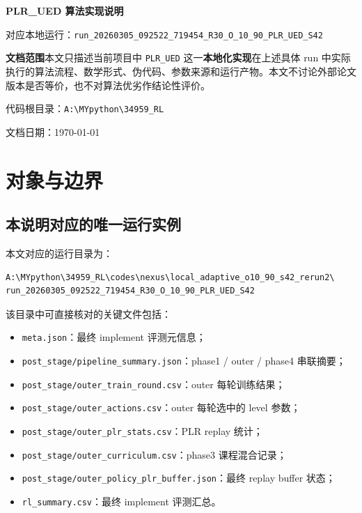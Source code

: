 \documentclass[11pt,a4paper]{ctexart}
\begin{document}
\begin{titlepage}
\centering
\vspace*{2cm}
{\Huge\bfseries PLR\_UED 算法实现说明\par}
\vspace{0.6cm}
{\Large 对应本地运行：\texttt{run\_20260305\_092522\_719454\_R30\_O\_10\_90\_PLR\_UED\_S42}\par}
\vspace{1.2cm}
\begin{tcolorbox}[colback=blue!3,colframe=MidnightBlue,boxrule=0.8pt,width=0.94\textwidth]
\textbf{文档范围}\quad 本文只描述当前项目中 \texttt{PLR\_UED} 这一\textbf{本地化实现}在上述具体 run 中实际执行的算法流程、数学形式、伪代码、参数来源和运行产物。本文不讨论外部论文版本是否等价，也不对算法优劣作结论性评价。
\end{tcolorbox}
\vfill
{\large 代码根目录：\texttt{A:\textbackslash MYpython\textbackslash 34959\_RL}\par}
{\large 文档日期：\today\par}
\end{titlepage}

\tableofcontents
\newpage

\section{对象与边界}

\subsection{本说明对应的唯一运行实例}
本文对应的运行目录为：
\begin{lstlisting}
A:\MYpython\34959_RL\codes\nexus\local_adaptive_o10_90_s42_rerun2\
run_20260305_092522_719454_R30_O_10_90_PLR_UED_S42
\end{lstlisting}

该目录中可直接核对的关键文件包括：
\begin{itemize}[leftmargin=2.2em,itemsep=0.2em]
    \item \texttt{meta.json}：最终 implement 评测元信息；
    \item \texttt{post\_stage/pipeline\_summary.json}：phase1 / outer / phase4 串联摘要；
    \item \texttt{post\_stage/outer\_train\_round.csv}：outer 每轮训练结果；
    \item \texttt{post\_stage/outer\_actions.csv}：outer 每轮选中的 level 参数；
    \item \texttt{post\_stage/outer\_plr\_stats.csv}：PLR replay 统计；
    \item \texttt{post\_stage/outer\_curriculum.csv}：phase3 课程混合记录；
    \item \texttt{post\_stage/outer\_policy\_plr\_buffer.json}：最终 replay buffer 状态；
    \item \texttt{rl\_summary.csv}：最终 implement 评测汇总。
\end{itemize}
\end{document}
